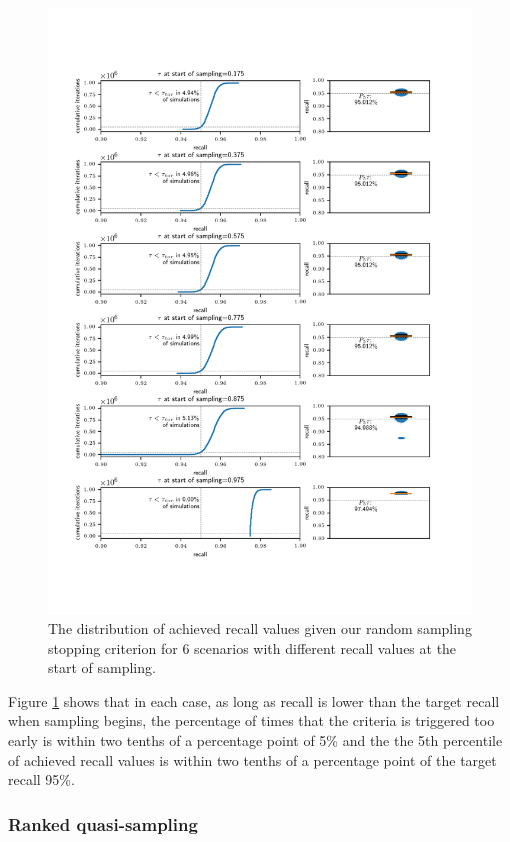 \documentclass{bmcart}
\begin{document}
	\begin{figure}
		\centering
		\includegraphics[width=\linewidth]{2_figs_hyper_validation.png}
		\caption{The distribution of achieved recall values given our random sampling stopping criterion for 6 scenarios with different recall values at the start of sampling.}
		\label{fig:hyper-valid}
	\end{figure}	
	
	Figure \ref{fig:hyper-valid} shows that in each case, as long as recall is lower than the target recall when sampling begins, the percentage of times that the criteria is triggered too early is within two tenths of a percentage point of 5\% and the the 5th percentile of achieved recall values is within two tenths of a percentage point of the target recall 95\%. 
	
	\subsubsection*{Ranked quasi-sampling}
	
\end{document}
